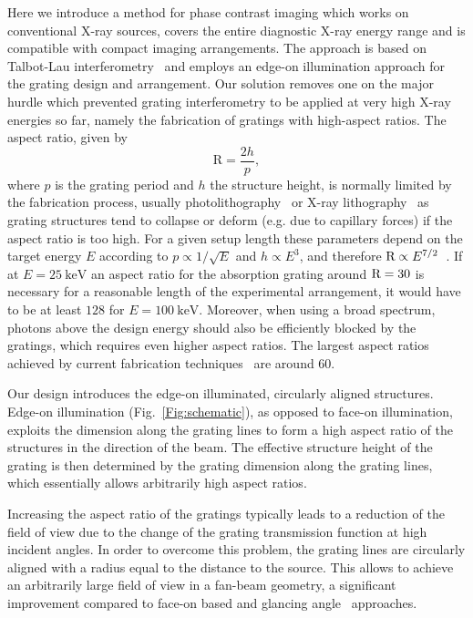 \documentclass{pnastwo}
\begin{document}
\begin{article}
Here we introduce a method for phase contrast imaging which works on
conventional X-ray sources, covers the entire diagnostic X-ray energy range
and is compatible with compact imaging arrangements. The approach is based
on
Talbot-Lau
interferometry~\cite{Pfeiffer2006} and employs an edge-on illumination approach for the grating design and
arrangement. 
Our solution removes one on the major hurdle which prevented grating interferometry to be applied at very high X-ray energies so far, namely the fabrication of gratings with high-aspect ratios.
 The aspect
ratio, given by
\begin{equation}
    \text{R} = \frac{2h}{p},
\end{equation}
where $p$ is the grating period and $h$ the  structure
height, is normally limited by the fabrication process, usually
photolithography~\cite{David2002} or X-ray lithography~\cite{Mohr2012} as grating
structures tend to collapse or deform (e.g. due to capillary forces) if
the aspect ratio is too high. For a given setup length these parameters
depend on the target energy $E$ according to $p \propto
1/\sqrt{E}$ and $h \propto E^3$, and therefore $\textnormal{R}
\propto E^{7/2}$~\cite{Momose2003a}. If at $E=\SI{25}{\kilo\electronvolt}$ an aspect ratio
for the absorption grating around $\textnormal{R}=30$ is necessary for a
reasonable length of the experimental arrangement, it would have to be at
least $128$ for $E=\SI{100}{\kilo\electronvolt}$. Moreover, when using a
broad spectrum, photons above the design energy should also be
efficiently blocked by the gratings, which requires even higher aspect ratios.
The largest aspect ratios achieved by current fabrication techniques~\cite{David2007,Kenntner2010} are around 60.

Our design introduces the edge-on
illuminated,  circularly aligned structures. Edge-on illumination
(Fig.~\ref{Fig:schematic}), as
opposed to face-on illumination, exploits the dimension along the grating
lines to form a high aspect ratio of the structures in the direction of the beam. The
effective structure height of the grating is then determined by the grating
dimension along the grating lines, which essentially allows arbitrarily high
aspect ratios. 

Increasing the aspect ratio of the gratings typically leads to a
reduction of the field of view due to the change of the grating transmission
function at high incident angles. In order to overcome this problem, the grating lines are circularly aligned 
with a radius equal to the distance to the source. 
This allows to achieve an arbitrarily large field of view in a fan-beam
geometry, a significant improvement compared to face-on based and glancing
angle~\cite{Stutman2012a} approaches.


\end{article}
\end{document}
